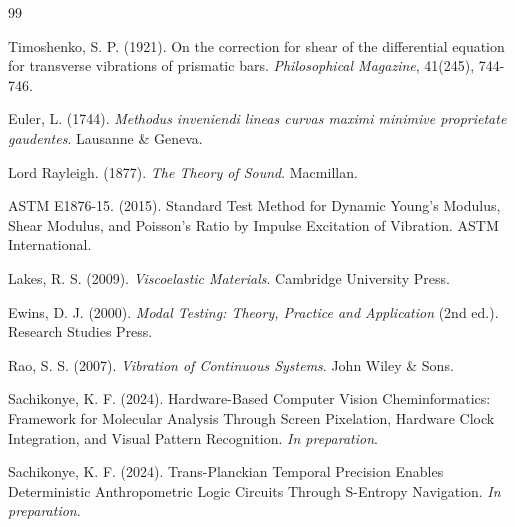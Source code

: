 \documentclass[12pt,a4paper]{article}
\begin{document}

\begin{thebibliography}{99}

Timoshenko, S. P. (1921). On the correction for shear of the differential equation for transverse vibrations of prismatic bars. \textit{Philosophical Magazine}, 41(245), 744-746.

Euler, L. (1744). \textit{Methodus inveniendi lineas curvas maximi minimive proprietate gaudentes}. Lausanne \& Geneva.

Lord Rayleigh. (1877). \textit{The Theory of Sound}. Macmillan.

ASTM E1876-15. (2015). Standard Test Method for Dynamic Young's Modulus, Shear Modulus, and Poisson's Ratio by Impulse Excitation of Vibration. ASTM International.

Lakes, R. S. (2009). \textit{Viscoelastic Materials}. Cambridge University Press.

Ewins, D. J. (2000). \textit{Modal Testing: Theory, Practice and Application} (2nd ed.). Research Studies Press.

Rao, S. S. (2007). \textit{Vibration of Continuous Systems}. John Wiley \& Sons.

Sachikonye, K. F. (2024). Hardware-Based Computer Vision Cheminformatics: Framework for Molecular Analysis Through Screen Pixelation, Hardware Clock Integration, and Visual Pattern Recognition. \textit{In preparation}.

Sachikonye, K. F. (2024). Trans-Planckian Temporal Precision Enables Deterministic Anthropometric Logic Circuits Through S-Entropy Navigation. \textit{In preparation}.

\end{thebibliography}
\end{document}
